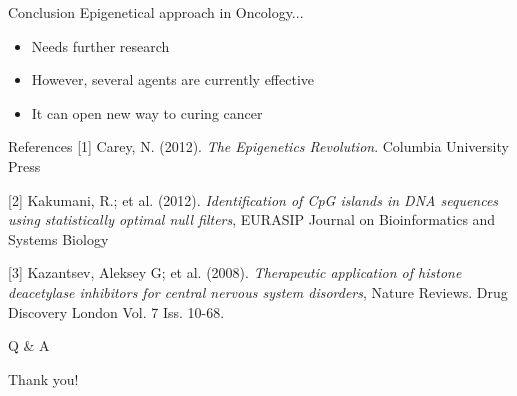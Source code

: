 \documentclass{beamer}
\begin{document}
    \begin{frame}{Conclusion}
        Epigenetical approach in Oncology...
        \begin{itemize}
            \item Needs further research
            \item However, several agents are currently effective
            \item It can open new way to curing cancer
        \end{itemize} 
    \end{frame}

    \begin{frame}{References}
        \footnotesize [1] Carey, N. (2012). \textit{The Epigenetics Revolution}. Columbia University Press
    
        \footnotesize [2] Kakumani, R.; et al. (2012). \textit{Identification of CpG islands in DNA sequences using statistically optimal null filters}, EURASIP Journal on Bioinformatics and Systems Biology 
    
        \footnotesize [3] Kazantsev, Aleksey G; et al. (2008). \textit{Therapeutic application of histone deacetylase inhibitors for central nervous system disorders}, Nature Reviews. Drug Discovery\; London Vol. 7 Iss. 10-68.
    \end{frame}

    \begin{frame}[plain]
        \centering
        \huge Q \& A
    \end{frame}

    \begin{frame}[plain]
        \centering
        \huge Thank you!
    \end{frame}
\end{document}
